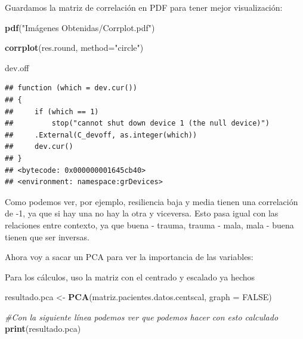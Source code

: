 \documentclass[]{article}
\newenvironment{Shaded}{\begin{snugshade}}{\end{snugshade}}
\newcommand{\CommentTok}[1]{\textcolor[rgb]{0.56,0.35,0.01}{\textit{#1}}}
\newcommand{\DataTypeTok}[1]{\textcolor[rgb]{0.13,0.29,0.53}{#1}}
\newcommand{\KeywordTok}[1]{\textcolor[rgb]{0.13,0.29,0.53}{\textbf{#1}}}
\newcommand{\NormalTok}[1]{#1}
\newcommand{\OtherTok}[1]{\textcolor[rgb]{0.56,0.35,0.01}{#1}}
\newcommand{\StringTok}[1]{\textcolor[rgb]{0.31,0.60,0.02}{#1}}
\begin{document}
Guardamos la matriz de correlación en PDF para tener mejor
visualización:

\begin{Shaded}
\begin{Highlighting}[]
\KeywordTok{pdf}\NormalTok{(}\StringTok{"Imágenes Obtenidas/Corrplot.pdf"}\NormalTok{)}

\KeywordTok{corrplot}\NormalTok{(res.round, }\DataTypeTok{method=}\StringTok{"circle"}\NormalTok{)}

\NormalTok{dev.off}
\end{Highlighting}
\end{Shaded}

\begin{verbatim}
## function (which = dev.cur()) 
## {
##     if (which == 1) 
##         stop("cannot shut down device 1 (the null device)")
##     .External(C_devoff, as.integer(which))
##     dev.cur()
## }
## <bytecode: 0x000000001645cb40>
## <environment: namespace:grDevices>
\end{verbatim}

Como podemos ver, por ejemplo, resiliencia baja y media tienen una
correlación de -1, ya que si hay una no hay la otra y viceversa. Esto
pasa igual con las relaciones entre contexto, ya que buena - trauma,
trauma - mala, mala - buena tienen que ser inversas.

Ahora voy a sacar un PCA para ver la importancia de las variables:

Para los cálculos, uso la matriz con el centrado y escalado ya hechos

\begin{Shaded}
\begin{Highlighting}[]
\NormalTok{resultado.pca <-}\StringTok{ }\KeywordTok{PCA}\NormalTok{(matriz.pacientes.datos.centscal, }\DataTypeTok{graph =} \OtherTok{FALSE}\NormalTok{)}

\CommentTok{#Con la siguiente línea podemos ver que podemos hacer con esto calculado}
\KeywordTok{print}\NormalTok{(resultado.pca)}
\end{Highlighting}
\end{Shaded}
\end{document}
